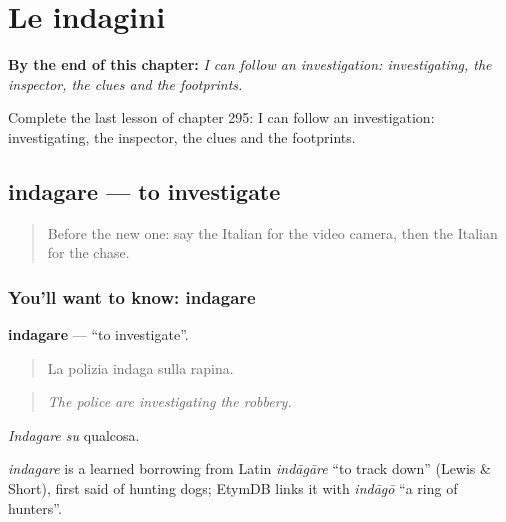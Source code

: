 
\chapter{Le indagini}
\label{ch:it-le-indagini}

\begin{chapteropening}
\textbf{By the end of this chapter:} \emph{I can follow an investigation: investigating, the inspector, the clues and the footprints.}

Complete the last lesson of chapter 295: I can follow an investigation: investigating, the inspector, the clues and the footprints.
\end{chapteropening}

\section[indagare]{indagare — to investigate}

\label{lesson:IT-C295-indagare}



\begin{quote}
Before the new one: say the Italian for the video camera, then the Italian for the chase.
\end{quote}

\subsection*{You'll want to know: indagare}
\textbf{indagare} — \textquotedblleft{}to investigate\textquotedblright{}.

\begin{quote}
La polizia indaga sulla rapina.
\end{quote}

\begin{quote}
\emph{The police are investigating the robbery.}
\end{quote}

\emph{Indagare su} qualcosa.

\begin{cousinweb}
\emph{indagare} is a learned borrowing from Latin \emph{indāgāre} \textquotedblleft{}to track down\textquotedblright{} (Lewis \& Short), first said of hunting dogs; EtymDB links it with \emph{indāgō} \textquotedblleft{}a ring of hunters\textquotedblright{}.
\end{cousinweb}

